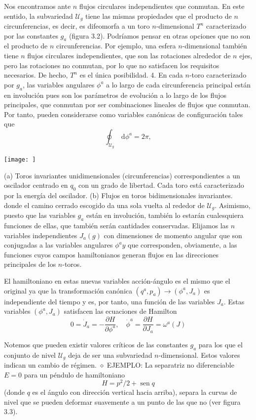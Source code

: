 Nos encontramos ante $n$ flujos circulares independientes que conmutan. En este sentido, la subvariedad $\mathscr{U}_{g}$ tiene las mismas propiedades que el producto de $n$ circunferencias, es decir, es difeomorfa a un toro $n$-dimensional $T^{n}$ caracterizado por las constantes $g_{a}$ (figura 3.2). Podríamos pensar en otras opciones que no son el producto de $n$ circunferencias. Por ejemplo, una esfera $n$-dimensional también tiene $n$ flujos circulares independientes, que son las rotaciones alrededor de $n$ ejes, pero las rotaciones no conmutan, por lo que no satisfacen los requisitos necesarios. De hecho, $T^{n}$ es el única posibilidad.
4. En cada $n$-toro caracterizado por $g_{a}$, las variables angulares $\phi^{a}$ a lo largo de cada circunferencia principal están en involución pues son los parámetros de evolución a lo largo de los flujos principales, que conmutan por ser combinaciones lineales de flujos que conmutan. Por tanto, pueden considerarse como variables canónicas de configuración tales que
$$
\oint_{\mathscr{U}_{g}} \mathrm{~d} \phi^{a}=2 \pi,
$$
\begin{marginfigure}[]
  \texttt{[image: ]}
  \caption[]{(a) Toros invariantes unidimensionales (circunferencias) correspondientes a un oscilador centrado en $q_{0}$ con un grado de libertad. Cada toro está caracterizado por la energía del oscilador. (b) Flujos en toros bidimensionales invariantes.
  donde el camino cerrado escogido da una sola vuelta al rededor de $\mathscr{U}_{g}$.
  Asimismo, puesto que las variables $g_{a}$ están en involución, también lo estarán cualesquiera funciones de ellas, que también serán cantidades conservadas. Elijamos las $n$ variables independientes $J_{a}(g)$ con dimensiones de momento angular que son conjugadas a las variables angulares $\phi^{a} y$ que corresponden, obviamente, a las funciones cuyos campos hamiltonianos generan flujos en las direcciones principales de los $n$-toros.}
\end{marginfigure}

El hamiltoniano en estas nuevas variables acción-ángulo es el mismo que el original ya que la transformación canónica $\left(q^{a}, p_{a}\right) \rightarrow\left(\phi^{a}, J_{a}\right)$ es independiente del tiempo y es, por tanto, una función de las variables $J_{a}$. Estas variables $\left(\phi^{a}, J_{a}\right)$ satisfacen las ecuaciones de Hamilton
$$
0=\dot{J}_{a}=-\frac{\partial H}{\partial \phi^{a}}, \quad \dot{\phi}^{a}=\frac{\partial H}{\partial J_{a}}=\omega^{a}(J)
$$

Notemos que pueden existir valores críticos de las constantes $g_{a}$ para los que el conjunto de nivel $\mathscr{U}_{g}$ deja de ser una subvariedad $n$-dimensional. Estos valores indican un cambio de régimen.
$\diamond$ EJEMPLO: La separatriz no diferenciable $E=0$ para un péndulo de hamiltoniano
$$
H=p^{2} / 2+\operatorname{sen} q
$$
(donde $q$ es el ángulo con dirección vertical hacia arriba), separa la curvas de nivel que se pueden deformar suavemente a un punto de las que no (ver figura 3.3).

